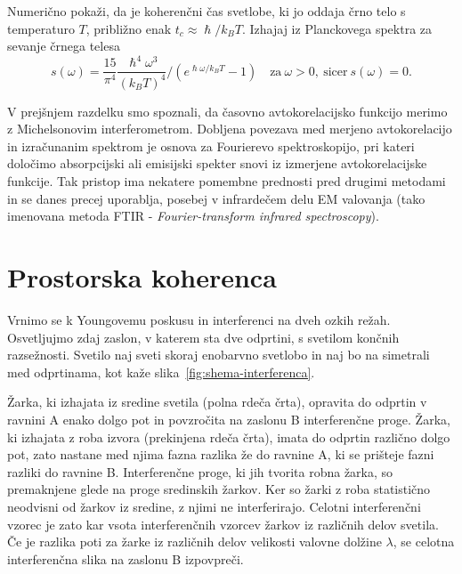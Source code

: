 \begin{definition}\label{naloga-Planck}
Numerično pokaži, da je koherenčni čas svetlobe, ki jo oddaja črno telo s 
temperaturo $T$, približno enak $t_{c}\approx{\hslash}/{k_{B}T}$.
Izhajaj iz Planckovega spektra za sevanje črnega telesa 
\begin{equation}
s(\omega)=\frac{15}{\pi^{4}} \frac{\hslash^4\omega^3}{(k_{B}T)^4}/\left(e^{\hslash\omega/k_{B}T}-1\right)
\quad \textrm{za}~\omega >0,~\textrm{sicer}~s(\omega) = 0.
\label{eq:Planckov-spekter}
\end{equation}
\end{definition}

\begin{remark}
V prejšnjem razdelku smo spoznali, da časovno avtokorelacijsko funkcijo
merimo z Michelsonovim interferometrom. Dobljena povezava med merjeno
avtokorelacijo in izračunanim spektrom je osnova za Fourierevo 
spektroskopijo,
pri kateri določimo absorpcijski ali emisijski spekter
snovi iz izmerjene avtokorelacijske funkcije. Tak pristop
ima nekatere pomembne prednosti pred drugimi metodami in se danes
precej uporablja, posebej v infrardečem delu EM valovanja (tako imenovana
metoda FTIR - {\it Fourier-transform infrared spectroscopy}).
\end{remark}

\section{Prostorska koherenca}
\label{Prostorska-koherenca}
Vrnimo se k Youngovemu poskusu in interferenci
 na dveh ozkih režah. Osvetljujmo zdaj zaslon, v katerem sta dve odprtini,
s svetilom končnih razsežnosti. Svetilo naj sveti skoraj enobarvno
svetlobo in naj bo na simetrali med odprtinama, kot kaže slika~\ref{fig:shema-interferenca}.

Žarka, ki izhajata iz sredine svetila (polna rdeča črta), 
opravita do odprtin v ravnini A enako dolgo pot in povzročita na zaslonu B 
interferenčne proge. Žarka, ki izhajata z roba izvora (prekinjena rdeča črta), 
imata do odprtin različno dolgo pot, zato nastane med njima fazna razlika že do ravnine A, 
ki se prišteje fazni razliki do ravnine B. Interferenčne proge, ki jih tvorita 
robna žarka, so premaknjene glede na proge sredinskih žarkov. Ker so žarki z roba
statistično neodvisni od žarkov iz sredine, z njimi
ne interferirajo. Celotni interferenčni vzorec je zato kar vsota interferenčnih
vzorcev žarkov iz različnih delov svetila. Če je razlika poti za žarke
iz različnih delov velikosti valovne dolžine $\lambda$, se celotna
interferenčna slika na zaslonu B izpovpreči.

